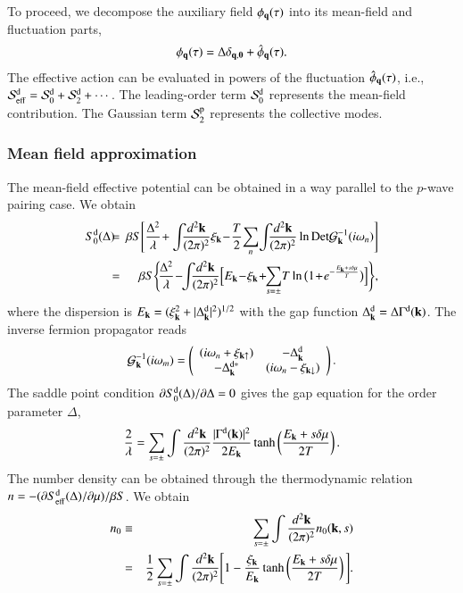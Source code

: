 \documentclass[aps,prd,amsmath,two column,nofootinbib,amssymb,referee]{revtex4}
\begin{document}
To proceed, we decompose the auxiliary field $\phi_{\bf q}(\tau)$ into its mean-field and fluctuation parts,
\begin{eqnarray}
\phi_{\bf q}(\tau)=\Delta\delta_{\bf q,0}+\hat\phi_{\bf q}(\tau).
\end{eqnarray}
The effective action can be evaluated in powers of the fluctuation $\hat\phi_{\bf q}(\tau)$, i.e., ${\cal S}_{\rm eff}^{\rm d}={\cal S}_0^{\rm d}+{\cal S}_2^{\rm d}+\cdots$. The leading-order term ${\cal S}_0^{\rm d}$ represents the mean-field contribution. The Gaussian term ${\cal S}_2^{\rm p}$  represents the collective modes.

\subsubsection{Mean field approximation}\label{sectiond1}
The mean-field effective potential can be obtained in a way parallel to the $p$-wave pairing case. We obtain
\begin{eqnarray}
S_0^{\rm d}(\Delta)\!\!\!&=&\!\!\!\beta S\Bigg[{\Delta^2\over\lambda}\!+\int\!\!\! {d^2{\bf k}\over(2\pi)^2}\xi_{\bf k}\!-\!{T\over2}\!\sum_{n}\!\int\!\!\! {d^2{\bf k}\over(2\pi)^2}\ln \text{Det}{\cal G}^{-1}_{\bf k}(i\omega_n)\Bigg]\nonumber\\
&=&\!\!\!{\beta S}\Bigg\{\!{\Delta^2\over\lambda}\!-\!\!\int\!\!\!{d^2{\bf k}\over(2\pi)^2}\Big[E_{\bf k}\!-\!\xi_{\bf k}\!+\!\!\sum_{s=\pm}\!T\ln\big(1\!+\!e^{-{E_{\bf k}+s\delta\mu\over T}}\big)\Big]\Bigg\},
\end{eqnarray}
where the dispersion is $E_{\bf k}=(\xi_{{\bf k}}^{2}+|\Delta_{\bf k}^{\rm d}|^2)^{1/2}$ with the gap function $\Delta_{\bf k}^{\rm d}=\Delta\Gamma^{\rm d}({\bf k})$. The inverse fermion propagator reads
\begin{eqnarray}
{\cal G}^{-1}_{\bf k}(i\omega_m)=\left(\begin{array}{cc}
(i\omega_n+\xi_{{\bf k}\uparrow})&-\Delta_{\bf k}^{\rm d}\\
-\Delta_{\bf k}^{{\rm d}*}&(i\omega_n-\xi_{{\bf k}\downarrow})
\end{array}\right).
\end{eqnarray}
The saddle point condition $\partial S_0^{\rm d}(\Delta)/\partial\Delta=0$ gives the gap equation for the order parameter $\Delta$, 
\begin{eqnarray}\label{gapd}
{2\over\lambda}=\sum_{s=\pm}\int {d^2{\bf k}\over(2\pi)^2}{|\Gamma^{\rm d}({\bf k})|^2\over 2E_{\bf k}}\tanh\left({E_{\bf k}+s\delta\mu\over2T}\right).
\end{eqnarray}
The number density can be obtained through the thermodynamic relation $n=-(\partial S_{\rm eff}^{\rm d}(\Delta)/\partial\mu)/\beta S$. We obtain
\begin{eqnarray}\label{numberd0}
n_0&\equiv&\sum_{s=\pm}\int{d^2{\bf k}\over(2\pi)^2}n_0({\bf k},s)\nonumber\\
&=&{1\over2}\sum_{s=\pm}\int{d^2{\bf k}\over(2\pi)^2}\Bigg[1-{\xi_{{\bf k}}\over E_{\bf k}}\tanh\left({E_{\bf k}+s\delta\mu\over2T}\right)\Bigg].
\end{eqnarray}
\end{document}
